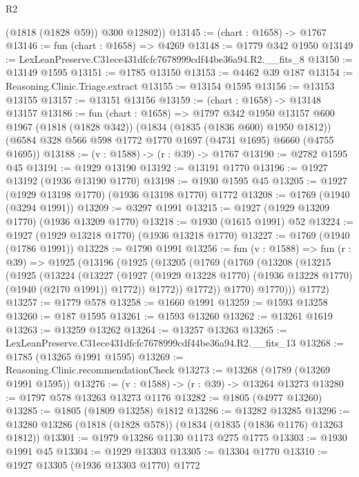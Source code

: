 \begin{lexlean}{R2}
\begin{coremodule}
        (@1818 (@1828 @59))
        @300
        @12802))
@13145 := (chart : @1658) -> @1767
@13146 := fun (chart : @1658) => @4269
@13148 := @1779 @342 @1950
@13149 := LexLeanPreserve.C31ece431dfcfc7678999cdf44be36a94.R2.__fits_8
@13150 := @13149 @1595
@13151 := @1785 @13150
@13153 := @4462 @39 @187
@13154 := Reasoning.Clinic.Triage.extract
@13155 := @13154 @1595
@13156 := @13153 @13155
@13157 := @13151 @13156
@13159 := (chart : @1658) -> @13148 @13157
@13186 := fun (chart : @1658) =>
  @1797
    @342
    @1950
    @13157
    @600
    @1967
    (@1818 (@1828 @342))
    (@1834 (@1835 (@1836 @600) @1950 @1812))
    (@6584 @328 @566 @598 @1772 @1770 @1697 (@4731 @1695) @6660 (@4755 @1695))
@13188 := (v : @1588) -> (r : @39) -> @1767
@13190 := @2782 @1595 @45
@13191 := @1929 @13190
@13192 := @13191 @1770
@13196 := @1927 @13192 (@1936 @13190 @1770)
@13198 := @1930 @1595 @45
@13205 := @1927 (@1929 @13198 @1770) (@1936 @13198 @1770) @1772
@13208 := @1769 (@1940 (@3294 @1991))
@13209 := @3297 @1991
@13215 := @1927 (@1929 @13209 @1770) (@1936 @13209 @1770)
@13218 := @1930 (@1615 @1991) @52
@13224 := @1927 (@1929 @13218 @1770) (@1936 @13218 @1770)
@13227 := @1769 (@1940 (@1786 @1991))
@13228 := @1790 @1991
@13256 := fun (v : @1588) =>
  fun (r : @39) =>
  @1925
    (@13196
      (@1925
        (@13205
          (@1769
            (@1769
              (@13208
                (@13215
                  (@1925
                    (@13224
                      (@13227
                        (@1927
                          (@1929 @13228 @1770)
                          (@1936 @13228 @1770)
                          (@1940 (@2170 @1991))
                          @1772))
                      @1772))
                  @1772))
              @1770)
            @1770)))
      @1772)
@13257 := @1779 @578
@13258 := @1660 @1991
@13259 := @1593 @13258
@13260 := @187 @1595
@13261 := @1593 @13260
@13262 := @13261 @1619
@13263 := @13259 @13262
@13264 := @13257 @13263
@13265 := LexLeanPreserve.C31ece431dfcfc7678999cdf44be36a94.R2.__fits_13
@13268 := @1785 (@13265 @1991 @1595)
@13269 := Reasoning.Clinic.recommendationCheck
@13273 := @13268 (@1789 (@13269 @1991 @1595))
@13276 := (v : @1588) -> (r : @39) -> @13264 @13273
@13280 := @1797 @578 @13263 @13273 @1176
@13282 := @1805 (@4977 @13260)
@13285 := @1805 (@1809 @13258) @1812
@13286 := @13282 @13285
@13296 := @13280 @13286 (@1818 (@1828 @578)) (@1834 (@1835 (@1836 @1176) @13263 @1812))
@13301 := @1979 @13286 @1130 @1173 @275 @1775
@13303 := @1930 @1991 @45
@13304 := @1929 @13303
@13305 := @13304 @1770
@13310 := @1927 @13305 (@1936 @13303 @1770) @1772

\end{coremodule}
\end{lexlean}
